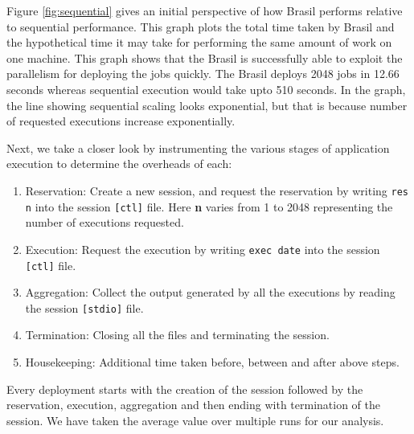 %
%
Figure \ref{fig:sequential} gives an initial perspective of how Brasil performs
relative to sequential performance.  This graph plots the total time taken by
Brasil and the hypothetical time it may take for performing the same amount of
work on one machine.  This graph shows that the Brasil is successfully able to
exploit the parallelism for deploying the jobs quickly. The Brasil deploys 2048
jobs in 12.66 seconds whereas sequential execution would take upto 510 seconds.
In the graph, the line showing sequential scaling looks exponential, but that is
because number of requested executions increase exponentially.

Next, we take a closer look by instrumenting the various stages of application
execution to determine the overheads of each:

\begin{enumerate}
\item Reservation: Create a new session, and request the reservation by writing
\texttt{res n} into the session \texttt{[ctl]} file.  Here \textbf{n} varies
from 1 to 2048 representing the number of executions requested. 

\item Execution: Request the execution by writing \texttt{exec date} into the
session \texttt{[ctl]} file.

\item Aggregation: Collect the output generated by all the executions by reading
the session \texttt{[stdio]} file.

\item Termination: Closing all the files and terminating the session.

\item Housekeeping: Additional time taken before, between and after above steps.
\end{enumerate}
Every deployment starts with the creation of the session followed by the
reservation, execution, aggregation and then ending with termination of the
session.  We have taken the average value over multiple runs for our analysis.

